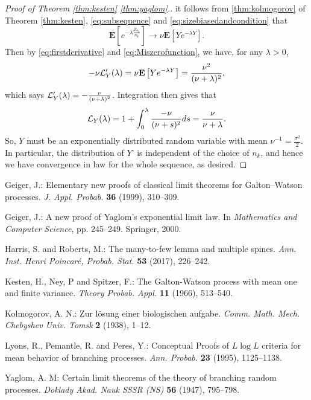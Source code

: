 \documentclass[12pt]{amsart}
\theoremstyle{remark}
\numberwithin{equation}{section}
\newcommand{\brac}[1]{\left[ #1 \right]}
\newcommand{\expct}{\mathbf E}
\begin{document}
\begin{proof}[Proof of   Theorem \ref{thm:kesten} \eqref{thm:yaglom}.]
it follows from \eqref{thm:kolmogorov} of Theorem \ref{thm:kesten},
\eqref{eq:subsequence} and \eqref{eq:sizebiasedandcondition} that
\begin{equation*}
	    \expct\brac{e^{-\lambda\frac{\dot Z_{n_k}}{n_k}}}
	\to
	    \nu\expct\brac{Ye^{-\lambda Y}}.
\end{equation*}
Then by \eqref{eq:firstderivative} and \eqref{eq:Miszerofunction}, we have,
 for any $\lambda >0$,
\begin{equation*}
	    -\nu\cL_Y'(\lambda)
	=
	    \nu\expct\brac{Ye^{-\lambda Y}}
    =	
	    \frac{\nu^2}{(\nu+\lambda)^2},
\end{equation*}
which says $\mathcal L_Y'(\lambda)=-\frac{\nu}{(\nu+\lambda)^2}$.
	Integration then gives that
\begin{equation*}
	    \mathcal L_Y(\lambda)
	=
	    1
	+
	    \int_0^\lambda\frac{-\nu}{(\nu+s)^2}ds
	=
	    \frac{\nu}{\nu+\lambda}.
\end{equation*}
	So, $Y$ must be an exponentially distributed random variable with mean $\nu^{-1}=\frac{\sigma^2}{2}$. 
In particular, the distribution of $Y$' is independent of the choice of $n_k$, 
	and hence we have convergence in law for the whole sequence, as desired.
\end{proof}

\vspace{.1in}


\begin{thebibliography}{99}

Geiger, J.:
Elementary new proofs of classical limit theorems for Galton--Watson processes.
{\it J. Appl. Probab.} \textbf{36} (1999), 310--309.

Geiger, J.:
A new proof of Yaglom's exponential limit law.
In {\it Mathematics and Computer Science}, pp. 245--249.
Springer, 2000.

Harris, S. and Roberts, M.:
The many-to-few lemma and multiple spines.
{\it Ann.  Inst. Henri Poincar{\'e}, Probab. Stat.}
\textbf{53} (2017), 226--242.

Kesten, H.,  Ney, P and Spitzer, F.:
The Galton-Watson process with mean one and finite variance.
{\it Theory Probab. Appl.} 
\textbf{11} (1966), 513--540.

Kolmogorov, A. N.:
Zur l{\"o}sung einer biologischen aufgabe.
{\it Comm. Math. Mech. Chebyshev Univ. Tomsk}
\textbf{2} (1938), 1--12.

Lyons, R.,  Pemantle, R. and Peres, Y.:
Conceptual Proofs of $ L \log L $ criteria for mean behavior of branching processes.
{\it Ann. Probab.} \textbf{23} (1995), 1125--1138.

Yaglom, A. M:
Certain limit theorems of the theory of branching random processes.
{\it Doklady Akad. Nauk SSSR (NS)} \textbf{56} (1947), 795--798.

\end{thebibliography}
\end{document}
